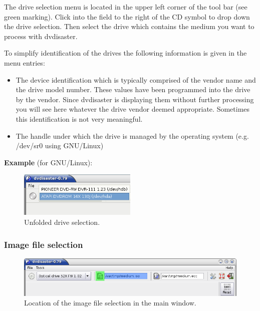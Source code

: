 The drive selection menu is located in the upper left corner of
the tool bar (see green marking). Click into the field to the right
of the CD symbol to drop down the drive selection. Then select the
drive which contains the medium you want to process with dvdisaster.

\medskip

To simplify identification of the drives the following information
is given in the menu entries:

\begin{itemize}
\item The device identification which is typically comprised
  of the vendor name and the drive model number. These values
  have been programmed into the drive by the vendor. Since dvdisaster
  is displaying them without further processing you will see here whatever
  the drive vendor deemed appropriate. Sometimes this identification
  is not very meaningful.
\item The handle under which the drive is managed by the operating
  system (e.g. /dev/sr0 using GNU/Linux)
\end{itemize}

\bigskip

{\bf Example} (for GNU/Linux):

\bigskip

\begin{figure}[h]
\centerline{\includegraphics[width=0.5\textwidth]{screenshots/dialog-drive-linux.png}}
\caption{Unfolded drive selection.}
\label{howto-dialog-drive-linux}
\end{figure}

\subsubsection{Image file selection}
\label{howto-dialogs-image}

\begin{figure}[h]
\centerline{\includegraphics[width=\textwidth]{screenshots/dialog-image-full.png}}
\caption{Location of the image file selection in the main window.}
\label{howto-dialog-image-full}
\end{figure}

